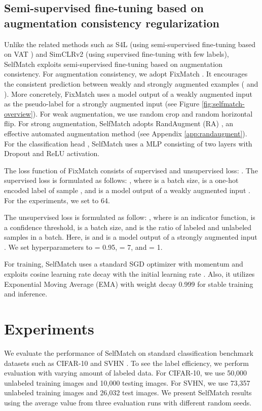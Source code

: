 \documentclass{article}
\begin{document}
\subsection{Semi-supervised fine-tuning based on augmentation consistency regularization}

Unlike the related methods such as S4L \cite{zhai2019s4l} (using semi-supervised fine-tuning based on VAT \cite{miyato2018virtual}) and SimCLRv2 \cite{chen2020big} (using supervised fine-tuning with few labels), SelfMatch exploits semi-supervised fine-tuning based on augmentation consistency. For augmentation consistency, we adopt FixMatch \cite{sohn2020fixmatch}. It encourages the consistent prediction between weakly and strongly augmented examples ( and ). More concretely, FixMatch uses a model output  of a weakly augmented input as the pseudo-label for a strongly augmented input  (see Figure \ref{fig:selfmatch-overview}). For weak augmentation, we use random crop and random horizontal flip. For strong augmentation, SelfMatch adopts RandAugment (RA) \cite{cubuk2020randaugment}, an effective automated augmentation method (see Appendix \ref{app:randaugment}). For the classification head , SelfMatch uses a MLP consisting of two layers with Dropout \cite{srivastava2014dropout} and ReLU activation.  

The loss function of FixMatch consists of supervised and unsupervised loss: . The supervised loss  is formulated as follows: , where  is a batch size,  is a one-hot encoded label of sample , and  is a model output  of a weakly augmented input . For the experiments, we set  to 64.

The unsupervised loss  is formulated as follow: , where  is an indicator function,  is a confidence threshold,  is a batch size, and  is the ratio of labeled and unlabeled samples in a batch. Here,  is  and  is a model output of a strongly augmented input . We set hyperparameters to  = 0.95,  = 7, and  = 1.

For training, SelfMatch uses a standard SGD optimizer with momentum  and exploits cosine learning rate decay \cite{loshchilov2017sgdr} with the initial learning rate . Also, it utilizes Exponential Moving Average (EMA) \cite{tarvainen2017mean} with weight decay 0.999 for stable training and inference. \section{Experiments}
\label{section:experiments}

We evaluate the performance of SelfMatch on standard classification benchmark datasets such as CIFAR-10 \cite{krizhevsky2009learning} and SVHN \cite{netzer2011reading}. To see the label efficiency, we perform evaluation with varying amount of labeled data. For CIFAR-10, we use 50,000 unlabeled training images and 10,000 testing images. For SVHN, we use 73,357 unlabeled training images and 26,032 test images. We present SelfMatch results using the average value from three evaluation runs with different random seeds.
\end{document}
